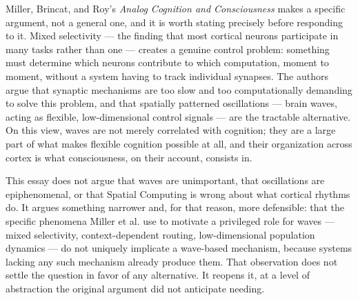 \documentclass[11pt]{article}
\begin{document}
Miller, Brincat, and Roy's \textit{Analog Cognition and Consciousness} makes a specific argument, not a general one, and it is worth stating precisely before responding to it. Mixed selectivity — the finding that most cortical neurons participate in many tasks rather than one — creates a genuine control problem: something must determine which neurons contribute to which computation, moment to moment, without a system having to track individual synapses. The authors argue that synaptic mechanisms are too slow and too computationally demanding to solve this problem, and that spatially patterned oscillations — brain waves, acting as flexible, low-dimensional control signals — are the tractable alternative. On this view, waves are not merely correlated with cognition; they are a large part of what makes flexible cognition possible at all, and their organization across cortex is what consciousness, on their account, consists in.

This essay does not argue that waves are unimportant, that oscillations are epiphenomenal, or that Spatial Computing is wrong about what cortical rhythms do. It argues something narrower and, for that reason, more defensible: that the specific phenomena Miller et al. use to motivate a privileged role for waves — mixed selectivity, context-dependent routing, low-dimensional population dynamics — do not uniquely implicate a wave-based mechanism, because systems lacking any such mechanism already produce them. That observation does not settle the question in favor of any alternative. It reopens it, at a level of abstraction the original argument did not anticipate needing.
\end{document}

